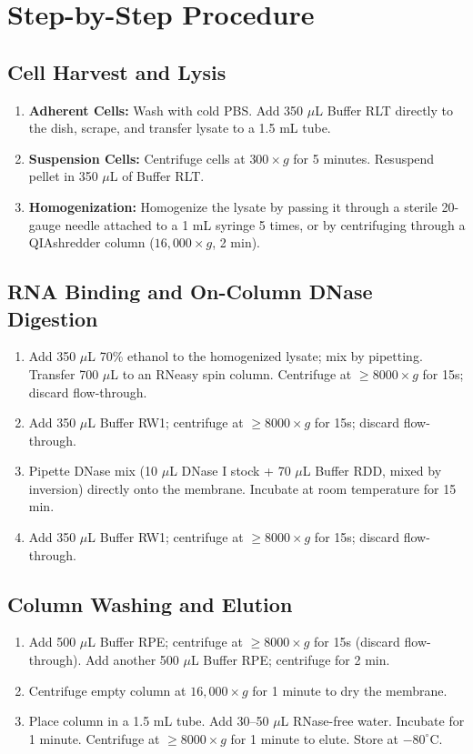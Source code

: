 \section{Step-by-Step Procedure}

\subsection{Cell Harvest and Lysis}
\begin{enumerate}
  \item \textbf{Adherent Cells:} Wash with cold PBS. Add 350 $\mu$L Buffer RLT directly to the dish, scrape, and transfer lysate to a 1.5 mL tube.
  \item \textbf{Suspension Cells:} Centrifuge cells at $300 \times g$ for 5 minutes. Resuspend pellet in 350 $\mu$L of Buffer RLT.
  \item \textbf{Homogenization:} Homogenize the lysate by passing it through a sterile 20-gauge needle attached to a 1 mL syringe 5 times, or by centrifuging through a QIAshredder column ($16,000 \times g$, 2 min).
\end{enumerate}

\subsection{RNA Binding and On-Column DNase Digestion}
\begin{enumerate}
  \item Add 350 $\mu$L 70\% ethanol to the homogenized lysate; mix by pipetting. Transfer 700 $\mu$L to an RNeasy spin column. Centrifuge at $\ge 8000 \times g$ for 15s; discard flow-through.
  \item Add 350 $\mu$L Buffer RW1; centrifuge at $\ge 8000 \times g$ for 15s; discard flow-through.
  \item Pipette DNase mix (10 $\mu$L DNase I stock + 70 $\mu$L Buffer RDD, mixed by inversion) directly onto the membrane. Incubate at room temperature for 15 min.
  \item Add 350 $\mu$L Buffer RW1; centrifuge at $\ge 8000 \times g$ for 15s; discard flow-through.
\end{enumerate}

\subsection{Column Washing and Elution}
\begin{enumerate}
  \item Add 500 $\mu$L Buffer RPE; centrifuge at $\ge 8000 \times g$ for 15s (discard flow-through). Add another 500 $\mu$L Buffer RPE; centrifuge for 2 min.
  \item Centrifuge empty column at $16,000 \times g$ for 1 minute to dry the membrane.
  \item Place column in a 1.5 mL tube. Add 30--50 $\mu$L RNase-free water. Incubate for 1 minute. Centrifuge at $\ge 8000 \times g$ for 1 minute to elute. Store at $-80^\circ$C.
\end{enumerate}
